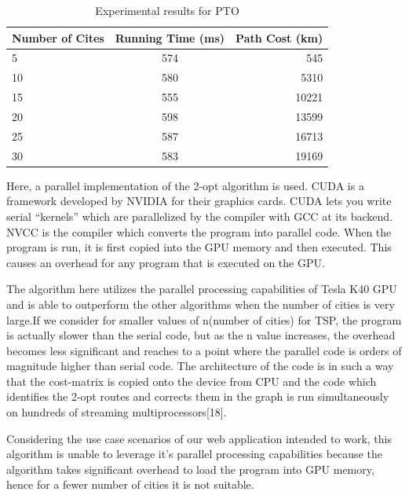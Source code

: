 \documentclass[conference]{IEEEtran}
\begin{document}
\begin{table}[h!]
  \begin{center}
    \label{tab:table3}
    \begin{tabular}{l|c|r}
      \textbf{Number of Cites} & \textbf{Running Time (ms)} & \textbf{Path Cost (km)}\\
      \hline
      5 & 574 & 545\\
      10 & 580 & 5310\\
      15 & 555 & 10221\\
      20 & 598 & 13599\\ 
      25 & 587 & 16713\\
      30 & 583 & 19169\\
    \end{tabular}
    \caption{Experimental results for PTO}
  \end{center}
\end{table}



Here, a parallel implementation of the 2-opt algorithm is used. CUDA is a framework developed by NVIDIA for their graphics cards. CUDA lets you write serial “kernels” which are parallelized by the compiler with GCC at its backend. NVCC is the compiler which converts the program into parallel code. When the program is run, it is first copied into the GPU memory and then executed. This causes an overhead for any program that is executed on the GPU. 

 The algorithm here utilizes the parallel processing capabilities of Tesla K40 GPU and is able to outperform the other algorithms when the number of cities is very large.If we consider for smaller values of n(number of cities) for TSP, the program is actually slower than the serial code, but as the n value increases, the overhead becomes less significant and reaches to a point where the parallel code is orders of magnitude higher than serial code. The architecture of the code is in such a way that the cost-matrix is copied onto the device from CPU and the code which identifies the 2-opt routes and corrects them in the graph is run simultaneously on hundreds of streaming multiprocessors[18]. 

 Considering the use case scenarios of our web application intended to work, this algorithm is unable to leverage it’s parallel processing capabilities because the algorithm takes significant overhead to load the program into GPU memory, hence for a fewer number of cities it is not suitable.
\end{document}

